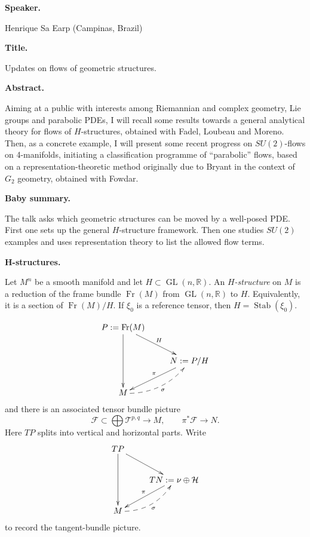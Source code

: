 \medskip\noindent
{\bf Speaker.}

Henrique Sa Earp
(Campinas, Brazil)

\medskip\noindent
{\bf Title.}

Updates on flows of geometric
structures.

\medskip\noindent
{\bf Abstract.}

Aiming at a public with interests
among Riemannian and complex
geometry,
Lie groups and parabolic PDEs,
I will recall some results towards a
general analytical theory for flows
of $H$-structures,
obtained with Fadel,
Loubeau and Moreno.
Then, as a concrete example,
I will present some recent progress
on $SU(2)$-flows on 4-manifolds,
initiating a classification
programme of ``parabolic'' flows,
based on a representation-theoretic
method originally due to Bryant
in the context of $G_2$ geometry,
obtained with Fowdar.

\medskip\noindent
{\bf Baby summary.}

The talk asks which geometric
structures can be moved by a
well-posed PDE.
First one sets up the general
$H$-structure framework.
Then one studies $SU(2)$ examples and
uses representation theory to list
the allowed flow terms.

\medskip\noindent
{\bf H-structures.}

\begin{definition}
\label{definition-let-m}
Let $M^n$ be a smooth manifold and
let $H\subset \operatorname{GL}(n,
\mathbb{R})$.
An {\it $H$-structure} on $M$ is a
reduction of the frame bundle
$\operatorname{Fr}(M)$ from
$\operatorname{GL}(n,\mathbb{R})$
to $H$.
Equivalently, it is a section of
$\operatorname{Fr}(M)/H$.
If $\xi_0$ is a reference tensor,
then $H=\operatorname{Stab}(\xi_0)$.
\end{definition}

$$
\xymatrix{
P:=\operatorname{Fr}(M)
\ar[dd]
\ar[dr]^H
&
\\
& N:=P/H
\ar[dl]_\pi
\\
M\ar@/^-1pc/@{-->}[ur]_{\sigma}
&
}
$$
and there is an associated
tensor bundle picture
$$
        \mathcal{F}\subset
        \bigoplus \mathcal{T}^{p,q}
        \to M,
        \qquad
        \pi^*\mathcal{F}\to N.
$$
Here $TP$ splits into vertical and
horizontal parts.
Write
$$
\xymatrix{
TP \ar[dd] \ar[dr]
&
\\
&
TN:=\nu\oplus\mathcal H\ar[dl]_\pi\\
M\ar@/^-1pc/@{-->}[ur]_{\sigma}
}
$$
to record the tangent-bundle picture.

